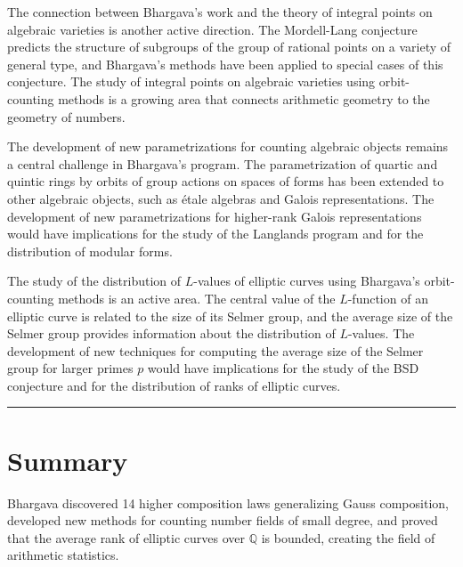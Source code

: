 The connection between Bhargava's work and the theory of integral points on algebraic varieties is another active direction. The Mordell-Lang conjecture predicts the structure of subgroups of the group of rational points on a variety of general type, and Bhargava's methods have been applied to special cases of this conjecture. The study of integral points on algebraic varieties using orbit-counting methods is a growing area that connects arithmetic geometry to the geometry of numbers.

The development of new parametrizations for counting algebraic objects remains a central challenge in Bhargava's program. The parametrization of quartic and quintic rings by orbits of group actions on spaces of forms has been extended to other algebraic objects, such as étale algebras and Galois representations. The development of new parametrizations for higher-rank Galois representations would have implications for the study of the Langlands program and for the distribution of modular forms.

The study of the distribution of $L$-values of elliptic curves using Bhargava's orbit-counting methods is an active area. The central value of the $L$-function of an elliptic curve is related to the size of its Selmer group, and the average size of the Selmer group provides information about the distribution of $L$-values. The development of new techniques for computing the average size of the Selmer group for larger primes $p$ would have implications for the study of the BSD conjecture and for the distribution of ranks of elliptic curves.

\begin{center}\rule{0.5\linewidth}{0.5pt}\end{center}

\section*{Summary}

Bhargava discovered 14 higher composition laws generalizing Gauss composition, developed new methods for counting number fields of small degree, and proved that the average rank of elliptic curves over $\mathbb{Q}$ is bounded, creating the field of arithmetic statistics.
